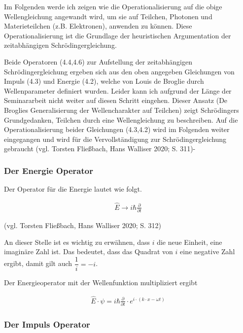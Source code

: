 \documentclass[12pt,oneside, a4paper]{scrbook}
\begin{document}
Im Folgenden werde ich zeigen wie die Operationalisierung auf die obige Wellengleichung angewandt wird, um sie auf Teilchen, Photonen und Materieteilchen (z.B. Elektronen), anwenden zu können. 
Diese Operationalisierung ist die Grundlage der heuristischen Argumentation der zeitabhängigen Schrödingergleichung.

Beide Operatoren (4.4,4.6) zur Aufstellung der zeitabhängigen Schrödingergleichung ergeben sich aus den oben angegeben Gleichungen von Impuls (4.3) und Energie (4.2), welche von Louis de Broglie durch Wellenparameter definiert wurden. Leider kann ich aufgrund der Länge der Seminararbeit nicht weiter auf diesen Schritt eingehen.
Dieser Ansatz (De Broglies Generalisierung der Wellencharakter auf Teilchen) zeigt Schrödingers Grundgedanken, Teilchen durch eine Wellengleichung zu beschreiben. Auf die Operationalisierung beider Gleichungen (4.3,4.2) wird im Folgenden weiter eingegangen und wird für die Vervollständigung zur Schrödingergleichung gebraucht  (vgl. Torsten Fließbach, Hans Walliser 2020; S. 311)-

\subsubsection{Der Energie Operator}

Der Operator für die Energie lautet wie folgt.

\begin{align}
 \widehat{E} \rightarrow i \hbar \frac{\partial}{\partial t}
\end{align}
\begin{center} (vgl. Torsten Fließbach, Hans Walliser 2020; S. 312) \end{center}

An dieser Stelle ist es wichtig zu erwähnen, dass ${i}$ die neue Einheit, eine imaginäre Zahl ist. Das bedeutet, dass das Quadrat von ${i}$ eine negative Zahl ergibt, damit gilt auch $\dfrac{1}{i}=-i$.

Der Energieoperator mit der Wellenfunktion multipliziert ergibt 

\begin{align}
 \widehat{E} \cdot \psi = i \hbar \frac{\partial}{\partial t} \cdot e^{i\cdot (k\cdot x-\omega t)}
\end{align}

\subsubsection{Der Impuls Operator}
\end{document}
